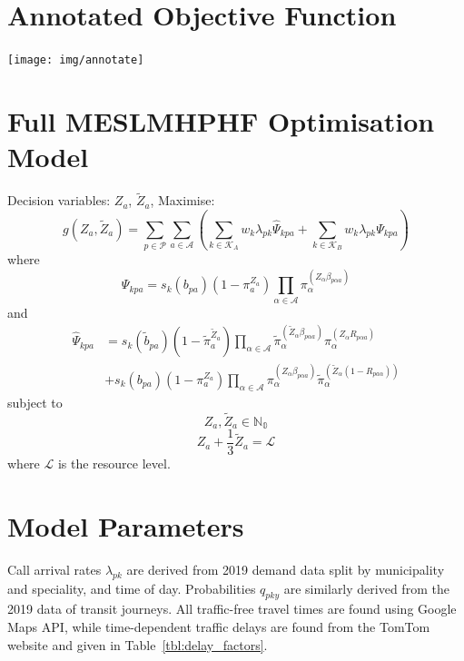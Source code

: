 \documentclass[numbers,webpdf,imaman]{ima-authoring-template}%
\begin{document}
\newpage

\appendix

\section{Annotated Objective Function}\label{apx:annotated}
\texttt{[image: img/annotate]}

\newpage

\section{Full MESLMHPHF Optimisation Model}\label{apx:fullmodel}
Decision variables: $Z_a$, $\tilde{Z}_a$,
Maximise:
\begin{equation*}
g\left(Z_a, \tilde{Z}_a\right) =
\sum_{p \in \mathcal{P}} \sum_{a \in \mathcal{A}}
\left( \sum_{k \in \mathcal{K}_A}  w_k \lambda_{pk} \hat{\Psi}_{kpa} +
\sum_{k \in \mathcal{K}_B}  w_k \lambda_{pk} \Psi_{kpa} \right)
\end{equation*}
where
\begin{equation*}
\Psi_{kpa} = s_k\left( b_{pa} \right)
\left(1 - \pi_{a}^{Z_a} \right)
\prod_{\alpha \in \mathcal{A}}
\pi_{\alpha}^{\left(Z_{\alpha} \beta_{p\alpha a} \right)}
\end{equation*}
and
\begin{align*}
\hat{\Psi}_{kpa} &= s_k\left(\tilde{b}_{pa}\right)
\left(1 - \tilde{\pi}_{a}^{\tilde{Z}_a} \right)
\prod_{\alpha \in \mathcal{A}}
\tilde{\pi}_{\alpha}^{\left(\tilde{Z}_{\alpha} \beta_{p\alpha a}\right)}
\pi_{\alpha}^{\left(Z_{\alpha} R_{p \alpha a}\right) } \nonumber \\
&+ s_k\left(b_{pa}\right) \left(1 - \pi_{a}^{Z_a} \right)
\prod_{\alpha \in \mathcal{A}}
\pi_{\alpha}^{\left(Z_{\alpha}\beta_{p\alpha a}\right)}
\tilde{\pi}_{\alpha}^{\left(\tilde{Z}_{\alpha}
\left(1 - R _{p a\alpha}\right)\right)}
\end{align*}
subject to
\begin{equation*}
Z_a, \tilde{Z}_a \in \mathbb{N_0}
\end{equation*}
\begin{equation*}
Z_a + \frac{1}{3} \tilde{Z}_a = \mathcal{L}
\end{equation*}
where $\mathcal{L}$ is the resource level.

\section{Model Parameters}\label{apx:parameters}
Call arrival rates $\lambda_{pk}$ are derived from 2019 demand data split by
municipality and speciality, and time of day. Probabilities $q_{pky}$ are
similarly derived from the 2019 data of transit journeys. All traffic-free
travel times are found using Google Maps API, while time-dependent traffic
delays are found from the TomTom website and given in
Table~\ref{tbl:delay_factors}.
\end{document}
